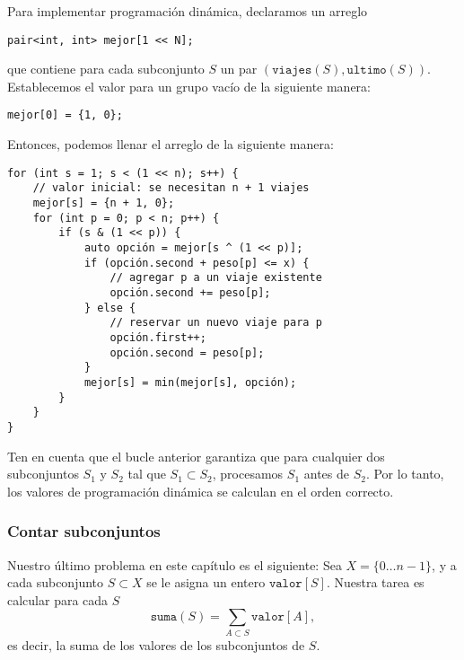 Para implementar programación dinámica,
declaramos un arreglo
\begin{lstlisting}
pair<int, int> mejor[1 << N];
\end{lstlisting}
que contiene para cada subconjunto $S$
un par $(\texttt{viajes}(S),\texttt{ultimo}(S))$.
Establecemos el valor para un grupo vacío de la siguiente manera:
\begin{lstlisting}
mejor[0] = {1, 0};
\end{lstlisting}
Entonces, podemos llenar el arreglo de la siguiente manera:

\begin{lstlisting}
for (int s = 1; s < (1 << n); s++) {
    // valor inicial: se necesitan n + 1 viajes
    mejor[s] = {n + 1, 0};
    for (int p = 0; p < n; p++) {
        if (s & (1 << p)) {
            auto opción = mejor[s ^ (1 << p)];
            if (opción.second + peso[p] <= x) {
                // agregar p a un viaje existente
                opción.second += peso[p];
            } else {
                // reservar un nuevo viaje para p
                opción.first++;
                opción.second = peso[p];
            }
            mejor[s] = min(mejor[s], opción);
        }
    }
}
\end{lstlisting}
Ten en cuenta que el bucle anterior garantiza que
para cualquier dos subconjuntos $S_1$ y $S_2$
tal que $S_1 \subset S_2$, procesamos $S_1$ antes de $S_2$.
Por lo tanto, los valores de programación dinámica se calculan en el
orden correcto.

\subsubsection{Contar subconjuntos}

Nuestro último problema en este capítulo es el siguiente:
Sea $X=\{0 \ldots n-1\}$, y a cada subconjunto $S \subset X$
se le asigna un entero $\texttt{valor}[S]$.
Nuestra tarea es calcular para cada $S$
\[\texttt{suma}(S) = \sum_{A \subset S} \texttt{valor}[A],\]
es decir, la suma de los valores de los subconjuntos de $S$.

